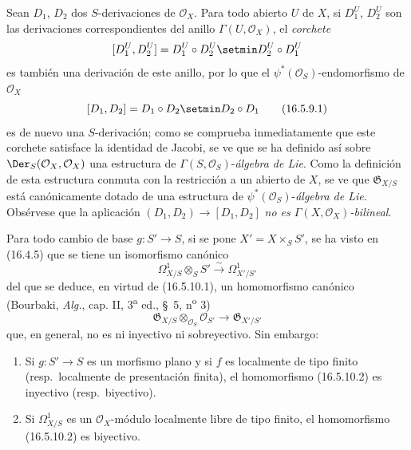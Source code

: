 \begin{env}[16.5.9]
\label{IV.16.5.9}
Sean $D_1$, $D_2$ dos $S$-derivaciones de $\mathcal{O}_X$. Para todo abierto
$U$ de $X$, si $D_1^U$, $D_2^U$ son las derivaciones correspondientes del
anillo $\Gamma(U,\mathcal{O}_X)$, el \emph{corchete}
\[
  [D_1^U,D_2^U]=D_1^U\circ D_2^U\setmin D_2^U\circ D_1^U
\]
es también una derivación de este anillo, por lo que el
$\psi^*(\mathcal{O}_S)$-endomorfismo de $\mathcal{O}_X$
\[
  [D_1,D_2]=D_1\circ D_2\setmin D_2\circ D_1
  \tag{16.5.9.1}
  \label{IV.16.5.9.1}
\]
es de nuevo una $S$-derivación; como se comprueba inmediatamente que este corchete
satisface la identidad de Jacobi, se ve que se ha definido así sobre
$\Der_S(\mathcal{O}_X,\mathcal{O}_X)$ una estructura de
$\Gamma(S,\mathcal{O}_S)$-\emph{álgebra de Lie}. Como la definición de esta
estructura conmuta con la restricción a un abierto de $X$, se ve que
$\mathfrak{G}_{X/S}$ está canónicamente dotado de una estructura de
$\psi^*(\mathcal{O}_S)$-\emph{álgebra de Lie}. Obsérvese que la aplicación
$(D_1,D_2)\to[D_1,D_2]$ \emph{no es
$\Gamma(X,\mathcal{O}_X)$-bilineal}.
\end{env}

\begin{env}[16.5.10]
\label{IV.16.5.10}
Para todo cambio de base $g:S'\to S$, si se pone $X'=X\times_S S'$, se
ha visto en (16.4.5) que se tiene un isomorfismo canónico
\[
  \varOmega_{X/S}^1\otimes_S S'\xrightarrow{\sim}\varOmega_{X'/S'}^1
  \tag{16.5.10.1}
  \label{IV.16.5.10.1}
\]
del que se deduce, en virtud de (16.5.10.1), un homomorfismo canónico
(Bourbaki, \emph{Alg.}, cap. II, 3\textsuperscript{a} ed., \S~5,
n\textsuperscript{o} 3)
\[
  \mathfrak{G}_{X/S}\otimes_{\mathcal{O}_S}\mathcal{O}_{S'}
  \longrightarrow\mathfrak{G}_{X'/S'}
  \tag{16.5.10.2}
  \label{IV.16.5.10.2}
\]
que, en general, no es ni inyectivo ni sobreyectivo. Sin embargo:
\end{env}

\begin{proposition}[16.5.11]
\label{IV.16.5.11}
\begin{enumerate}
\item[\textup{(i)}] Si $g:S'\to S$ es un morfismo plano y si $f$ es localmente de
tipo finito \textup{(resp.}\ localmente de presentación finita\textup{)}, el homomorfismo
\textup{(16.5.10.2)} es inyectivo \textup{(resp.}\ biyectivo\textup{)}.
\item[\textup{(ii)}] Si $\varOmega_{X/S}^1$ es un $\mathcal{O}_X$-módulo localmente libre
de tipo finito, el homomorfismo \textup{(16.5.10.2)} es biyectivo.
\end{enumerate}
\end{proposition}

